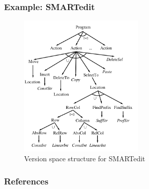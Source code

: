 \documentclass[]{beamer}
\begin{document}
\begin{frame}
\frametitle{Example: SMARTedit}

\begin{figure}[h]
	\centering
	\includegraphics[width=6cm]{smartedit.png}
	\caption{Version space structure for SMARTedit}
\end{figure}

\end{frame}

\begin{frame}
	\frametitle{References}
	
\end{frame}
\end{document}
